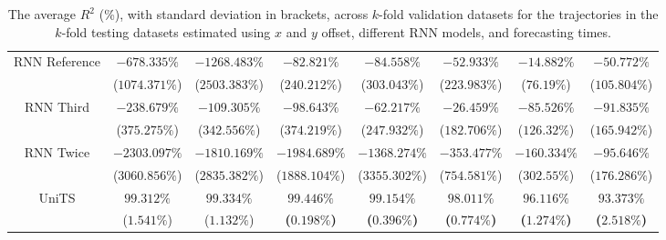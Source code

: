 \begin{table}[!ht]
{\begin{tabular}{|c|c|c|c|c|c|c|c|}
			\multirow{2}{*}{RNN Reference} & $-678.335\%$ & $-1268.483\%$ & $-82.821\%$ & $-84.558\%$ & $-52.933\%$ & $-14.882\%$ & $-50.772\%$ \\
			 & ($1074.371\%$) & ($2503.383\%$) & ($240.212\%$) & ($303.043\%$) & ($223.983\%$) & ($76.19\%$) & ($105.804\%$) \\ \hline
			\multirow{2}{*}{RNN Third} & $-238.679\%$ & $-109.305\%$ & $-98.643\%$ & $-62.217\%$ & $-26.459\%$ & $-85.526\%$ & $-91.835\%$ \\
			 & ($375.275\%$) & ($342.556\%$) & ($374.219\%$) & ($247.932\%$) & ($182.706\%$) & ($126.32\%$) & ($165.942\%$) \\ \hline
			\multirow{2}{*}{RNN Twice} & $-2303.097\%$ & $-1810.169\%$ & $-1984.689\%$ & $-1368.274\%$ & $-353.477\%$ & $-160.334\%$ & $-95.646\%$ \\
			 & ($3060.856\%$) & ($2835.382\%$) & ($1888.104\%$) & ($3355.302\%$) & ($754.581\%$) & ($302.55\%$) & ($176.286\%$) \\ \hline
			\multirow{2}{*}{UniTS} & $99.312\%$ & $99.334\%$ & $\mathbf{99.446\%}$ & $\mathbf{99.154\%}$ & $\mathbf{98.011\%}$ & $\mathbf{96.116\%}$ & $\mathbf{93.373\%}$ \\
			 & ($1.541\%$) & ($1.132\%$) & \textbf{(}$\mathbf{0.198\%}$\textbf{)} & \textbf{(}$\mathbf{0.396\%}$\textbf{)} & \textbf{(}$\mathbf{0.774\%}$\textbf{)} & \textbf{(}$\mathbf{1.274\%}$\textbf{)} & \textbf{(}$\mathbf{2.518\%}$\textbf{)} \\ \hline
		\end{tabular}
	}
	\caption{The average $R^{2}$ (\%), with standard deviation in brackets, across $k$-fold validation datasets for the trajectories in the $k$-fold testing datasets estimated using $x$ and $y$ offset, different RNN models, and forecasting times.}
	\label{tab:all_no_abs_R2}
\end{table}